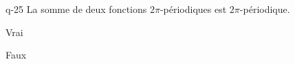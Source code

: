 \begin{truefalse}{q-25}
La somme de deux fonctions $2\pi$-périodiques est $2\pi$-périodique.
\item* Vrai
\item Faux
\end{truefalse}

